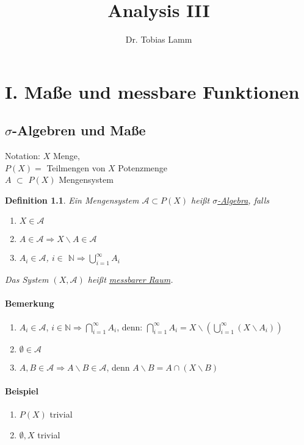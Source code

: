 \documentclass[11pt]{report}
\newtheorem{defi}{Definition}
\begin{document}
\title{Analysis III}
\author{Dr. Tobias Lamm}
\maketitle
\chapter{I. Maße und messbare Funktionen}
\section{ $\sigma$-Algebren und Maße} 
Notation: $X$ Menge, \\ $P(X) =$ \textbraceleft Teilmengen von $X$\textbraceright  {} Potenzmenge \\
$A$ $\subset$  $P(X)$ Mengensystem
\begin{defi}
Ein Mengensystem $\mathscr{A} \subset P(X)$ heißt \underline{$\sigma$-Algebra}, falls
\begin{enumerate}
	\item $X \in \mathscr{A}$
	\item $A \in \mathscr{A} \Rightarrow X \backslash A \in \mathscr{A}$
	\item $A_i \in \mathscr{A}$, $i \in$ $\mathbb{N} \Rightarrow \bigcup_{i = 1}^{\infty} A_i$
\end{enumerate}
Das System $(X, \mathscr{A})$ heißt \underline{messbarer Raum}.
\end{defi}

\subsubsection{Bemerkung}
\begin{enumerate}
	\item $A_i \in \mathscr{A}$, $i \in \mathbb{N} \Rightarrow \bigcap_{i = 1}^{\infty} A_i$, denn:
	$\bigcap_{i=1}^{\infty} A_i = X\backslash (\bigcup_{i=1}^{\infty} (X \backslash A_i))$
	\item $\emptyset \in \mathscr{A}$
	\item $A, B \in \mathscr{A} \Rightarrow A \backslash B \in \mathscr{A}$, denn $A \backslash B = A \cap (X \backslash B)$
\end{enumerate}

\subsubsection{Beispiel}
\begin{enumerate}
	\item $P(X)$ trivial
	\item \textbraceleft$ \emptyset, X $\textbraceright{} trivial 
\end{enumerate}
\end{document}
